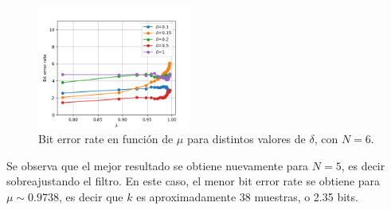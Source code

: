 \documentclass[main.tex]{subfiles}
\begin{document}
\begin{figure}[htb]
	\centering
	\includegraphics[width=0.45\textwidth]
	{imagenes/rls_ber_n6.png}
	\caption{Bit error rate en funci\'on de $\mu$ para distintos valores de $\delta$, con $N=6$.}
	\label{fig:rls6}
\end{figure}

Se observa que el mejor resultado se obtiene nuevamente para $N=5$, es decir sobreajustando el filtro. En este caso, el menor bit error rate se obtiene para $\mu\sim 0.9738$, es decir que $k$ es aproximadamente 38 muestras, o 2.35 bits.
\end{document}
